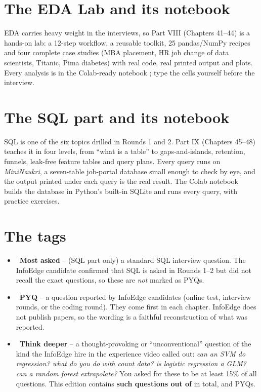 \section*{The EDA Lab and its notebook}
EDA carries heavy weight in the interviews, so Part VIII (Chapters 41--44) is a hands-on lab: a 12-step workflow, a reusable toolkit, 25 pandas/NumPy recipes and four complete case
studies (MBA placement, HR job change of data scientists, Titanic, Pima diabetes) with real code, real printed output and plots. Every analysis is in the Colab-ready notebook
; type the cells yourself before the interview.

\section*{The SQL part and its notebook}
SQL is one of the six topics drilled in Rounds 1 and 2. Part IX (Chapters 45--48) teaches it in four levels, from ``what is a table'' to gaps-and-islands,
retention, funnels, leak-free feature tables and query plans. Every query runs on \emph{MiniNaukri}, a seven-table job-portal database small enough to check
by eye, and the output printed under each query is the real result. The Colab notebook 
builds the database in Python's built-in SQLite and runs every query, with practice exercises.

\section*{The tags}
\begin{itemize}
\item \textcolor{exframe}{\faCheckCircle\ \textbf{Most asked}} -- (SQL part only) a standard SQL interview question. The InfoEdge candidate confirmed that
  SQL is asked in Rounds 1--2 but did not recall the exact questions, so these are \emph{not} marked as PYQs.
\item \textcolor{pyqc}{\faStar\ \textbf{PYQ}} -- a question reported by InfoEdge candidates
  (online test, interview rounds, or the coding round). They come first in each chapter. InfoEdge does
  not publish papers, so the wording is a faithful reconstruction of what was reported.
\item \textcolor{deepc}{\faBrain\ \textbf{Think deeper}} -- a thought-provoking or ``unconventional''
  question of the kind the InfoEdge hire in the experience video called out: \emph{can an SVM do
  regression? what do you do with count data? is logistic regression a GLM? can a random forest
  extrapolate?} You asked for these to be at least 15\% of all questions. This edition contains
  \textbf{ such questions out of } in total, and \textbf{} PYQs.
\end{itemize}

